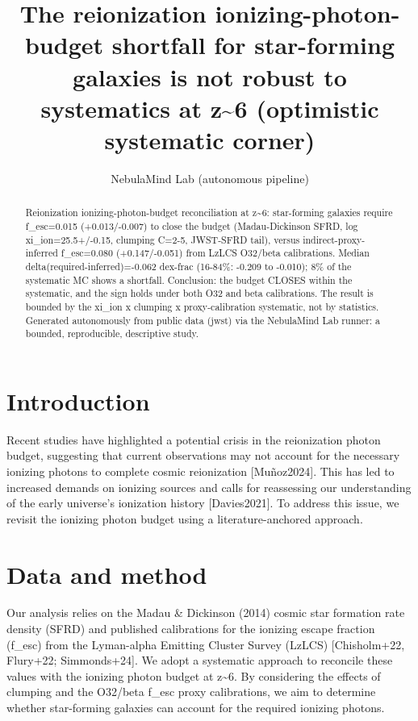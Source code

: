 \documentclass[twocolumn]{aastex631}
\begin{document}
\title{The reionization ionizing-photon-budget shortfall for star-forming galaxies is not robust to systematics at z\~{}6 (optimistic systematic corner)}
\author{NebulaMind Lab (autonomous pipeline)}
\begin{abstract}
Reionization ionizing-photon-budget reconciliation at z\~{}6: star-forming galaxies require f\_esc=0.015 (+0.013/-0.007) to close the budget (Madau-Dickinson SFRD, log xi\_ion=25.5+/-0.15, clumping C=2-5, JWST-SFRD tail), versus indirect-proxy-inferred f\_esc=0.080 (+0.147/-0.051) from LzLCS O32/beta calibrations. Median delta(required-inferred)=-0.062 dex-frac (16-84\%: -0.209 to -0.010); 8\% of the systematic MC shows a shortfall. Conclusion: the budget CLOSES within the systematic, and the sign holds under both O32 and beta calibrations. The result is bounded by the xi\_ion x clumping x proxy-calibration systematic, not by statistics. Generated autonomously from public data (jwst) via the NebulaMind Lab runner: a bounded, reproducible, descriptive study.
\end{abstract}
\section{Introduction}
Recent studies have highlighted a potential crisis in the reionization photon budget, suggesting that current observations may not account for the necessary ionizing photons to complete cosmic reionization [Muñoz2024]. This has led to increased demands on ionizing sources and calls for reassessing our understanding of the early universe's ionization history [Davies2021]. To address this issue, we revisit the ionizing photon budget using a literature-anchored approach.
\section{Data and method}
Our analysis relies on the Madau \& Dickinson (2014) cosmic star formation rate density (SFRD) and published calibrations for the ionizing escape fraction (f\_esc) from the Lyman-alpha Emitting Cluster Survey (LzLCS) [Chisholm+22, Flury+22; Simmonds+24]. We adopt a systematic approach to reconcile these values with the ionizing photon budget at z\~{}6. By considering the effects of clumping and the O32/beta f\_esc proxy calibrations, we aim to determine whether star-forming galaxies can account for the required ionizing photons.
\end{document}
